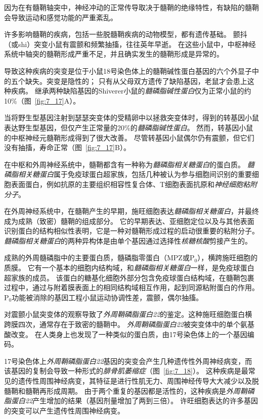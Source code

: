 \begin{proposition}[髓鞘蛋白缺陷破坏神经信号传导] \label{box:7_3}
	
	\quad \quad 因为在有髓鞘轴突中，神经冲动的正常传导取决于髓鞘的绝缘特性，有缺陷的髓鞘会导致运动和感觉功能的严重紊乱。
	
	\quad \quad 许多影响髓鞘的疾病，包括一些脱髓鞘疾病的动物模型，都有遗传基础。
	颤抖（或shi）突变小鼠有震颤和频繁抽搐，往往英年早逝。
	在这些小鼠中，中枢神经系统中轴突的髓鞘形成严重不足，并且确实发生的髓鞘形成是异常的。
	
	\quad \quad 导致这种疾病的突变是位于小鼠18号染色体上的髓鞘碱性蛋白基因的六个外显子中的五个缺失。突变是隐性的；
	只有从父母双方遗传了缺陷基因，老鼠才会患上这种疾病。
	继承两种缺陷基因的Shiverer小鼠的\textit{髓磷脂碱性蛋白}仅为正常小鼠的约10\%（图~\ref{fig:7_17}A）。
	
	\quad \quad 当将野生型基因注射到瑟瑟突变体的受精卵中以拯救突变体时，得到的转基因小鼠表达野生型基因，但仅产生正常量的20\%的\textit{髓磷脂碱性蛋白}。
	然而，转基因小鼠的中枢神经元髓鞘形成得到了很大改善。
	尽管转基因小鼠偶尔仍有震颤，但它们没有抽搐，寿命正常（图~\ref{fig:7_17}B）。
	
	\quad \quad 在中枢和外周神经系统中，髓鞘都含有一种称为\textit{髓磷脂相关糖蛋白}的蛋白质。
	\textit{髓磷脂相关糖蛋白}属于免疫球蛋白超家族，包括几种被认为参与细胞间识别的重要细胞表面蛋白，例如抗原的主要组织相容性复合体、T细胞表面抗原和\textit{神经细胞粘附分子}。
	
	\quad \quad 在外周神经系统中，在髓鞘产生的早期，施旺细胞表达\textit{髓磷脂相关糖蛋白}，并最终成为成熟（致密）髓鞘的组成部分。
	它的早期表达、亚细胞定位以及与其他表面识别蛋白的结构相似性表明，它是一种对髓鞘形成过程的启动很重要的粘附分子。
	\textit{髓磷脂相关糖蛋白}的两种异构体是由单个基因通过选择性\textit{核糖核酸}剪接产生的。
	
	\quad 成熟的外周髓磷脂中的主要蛋白质，髓磷脂零蛋白（MPZ或P$_0$），横跨施旺细胞的质膜。
	它有一个基本的细胞内结构域，和\textit{髓磷脂相关糖蛋白}一样，是免疫球蛋白超家族的成员。
	该蛋白的糖基化细胞外部分包含免疫球蛋白结构域，在髓鞘包裹过程中，通过与附着膜表面上的相同结构域相互作用，起到同源粘附蛋白的作用。
	P$_0$功能被消除的基因工程小鼠运动协调性差，震颤，偶尔抽搐。
	
	\quad 对震颤小鼠突变体的观察导致了\textit{外周鞘磷脂蛋白22}的鉴定。这种施旺细胞蛋白横跨膜四次，通常存在于致密的髓鞘中。
	\textit{外周鞘磷脂蛋白22}被突变体中的单个氨基酸改变。
	在人类身上也发现了一种类似的蛋白质，由17号染色体上的一个基因编码。
	
	\quad \quad 17号染色体上\textit{外周鞘磷脂蛋白22}基因的突变会产生几种遗传性外周神经病变，而该基因的复制会导致一种形式的\textit{腓骨肌萎缩症}（图~\ref{fig:7_18}）。
	这种疾病是最常见的遗传性周围神经病变，其特征是进行性肌无力、周围神经传导大大减少以及脱髓鞘和髓鞘再形成周期。
	由于两个重复的基因都是活性的，这种疾病是\textit{外周鞘磷脂蛋白22}产生增加的结果（基因剂量增加了两到三倍）。
	许旺细胞表达的许多基因的突变可以产生遗传性周围神经病变。
	

\end{proposition}
